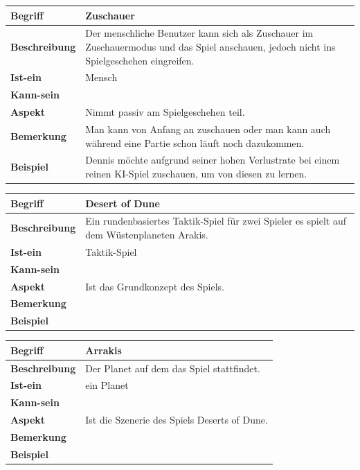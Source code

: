 \documentclass{uulm-assignment}
\newcounter{fa}
\newcounter{nfa}
\begin{document}
\begin{tabularx}{16cm}{|l|X|}
\hline
\textbf{Begriff} & \textbf{Zuschauer} \\
\hline
\textbf{Beschreibung} & Der menschliche Benutzer kann sich als Zuschauer im Zuschauermodus und das Spiel anschauen, jedoch nicht ins Spielgeschehen eingreifen. \\
\hline
\textbf{Ist-ein} & Mensch\\
\hline
\textbf{Kann-sein} & \\
\hline
\textbf{Aspekt} & Nimmt passiv am Spielgeschehen teil.\\
\hline
\textbf{Bemerkung} & Man kann von Anfang an zuschauen oder man kann auch während eine Partie schon läuft noch dazukommen.\\
\hline
\textbf{Beispiel} &  Dennis möchte aufgrund seiner hohen Verlustrate bei einem reinen KI-Spiel zuschauen, um von diesen zu lernen. \\
\hline
\end{tabularx}

\begin{tabularx}{16cm}{|l|X|}
\hline
\textbf{Begriff} & \textbf{Desert of Dune} \\
\hline
\textbf{Beschreibung} & Ein rundenbasiertes Taktik-Spiel für zwei Spieler es spielt auf dem Wüstenplaneten Arakis. \\
\hline
\textbf{Ist-ein} & Taktik-Spiel\\
\hline
\textbf{Kann-sein} & \\
\hline
\textbf{Aspekt} & Ist das Grundkonzept des Spiels. \\
\hline
\textbf{Bemerkung} & \\
\hline
\textbf{Beispiel} &  \\
\hline
\end{tabularx}

\begin{tabularx}{16cm}{|l|X|}
\hline
\textbf{Begriff} & \textbf{Arrakis} \\
\hline
\textbf{Beschreibung} & Der Planet auf dem das Spiel stattfindet.\\
\hline
\textbf{Ist-ein} & ein Planet\\
\hline
\textbf{Kann-sein} & \\
\hline
\textbf{Aspekt} & Ist die Szenerie des Spiels Deserts of Dune. \\
\hline
\textbf{Bemerkung} & \\
\hline
\textbf{Beispiel} &  \\
\hline
\end{tabularx}
\end{document}
